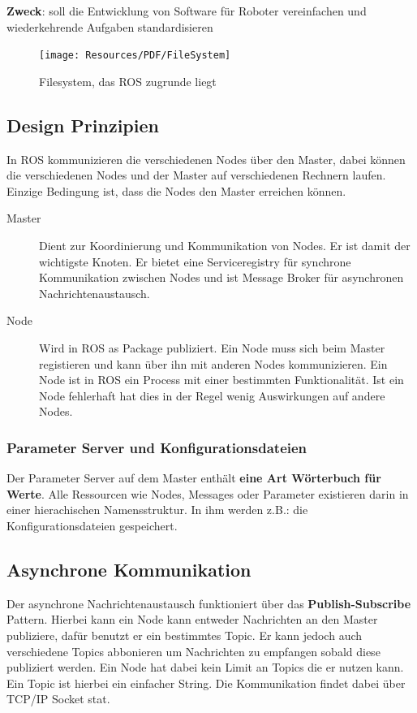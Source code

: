 \textbf{Zweck}: soll die Entwicklung von Software für Roboter vereinfachen und wiederkehrende Aufgaben standardisieren

\begin{figure}[H]
	\begin{center}
		\texttt{[image: Resources/PDF/FileSystem]}
		\caption{Filesystem, das ROS zugrunde liegt}
		\label{fig:PDF/FileSystem}
	\end{center}
\end{figure}

\subsection{Design Prinzipien}
In ROS kommunizieren die verschiedenen Nodes über den Master, dabei können
die verschiedenen Nodes und der Master auf verschiedenen Rechnern laufen.
Einzige Bedingung ist, dass die Nodes den Master erreichen können.

\begin{description}
	\item[Master] Dient zur Koordinierung und Kommunikation von Nodes. Er ist
		damit der wichtigste Knoten. Er bietet eine Serviceregistry für synchrone
		Kommunikation zwischen Nodes und ist Message Broker für asynchronen
		Nachrichtenaustausch.
	\item[Node] Wird in ROS as Package publiziert. Ein Node muss sich beim Master
		registieren und kann über ihn mit anderen Nodes kommunizieren. Ein Node
		ist in ROS ein Process mit einer bestimmten Funktionalität. Ist ein Node
		fehlerhaft hat dies in der Regel wenig Auswirkungen auf andere Nodes.
\end{description}

\subsubsection{Parameter Server und Konfigurationsdateien}
Der Parameter Server auf dem Master enthält \textbf{eine Art Wörterbuch für
Werte}. Alle Ressourcen wie Nodes, Messages oder Parameter existieren darin in
einer hierachischen Namensstruktur. In ihm werden z.B.: die
Konfigurationsdateien gespeichert.

\subsection{Asynchrone Kommunikation}
Der asynchrone Nachrichtenaustausch funktioniert über das
\textbf{Publish-Subscribe} Pattern. Hierbei kann ein Node kann entweder
Nachrichten an den Master  publiziere, dafür benutzt er ein bestimmtes Topic.
Er kann jedoch auch verschiedene Topics abbonieren um Nachrichten zu empfangen
sobald diese publiziert werden. Ein Node hat dabei kein Limit an Topics die er
nutzen kann. Ein Topic ist hierbei ein einfacher String. Die Kommunikation
findet dabei über TCP/IP Socket stat.

